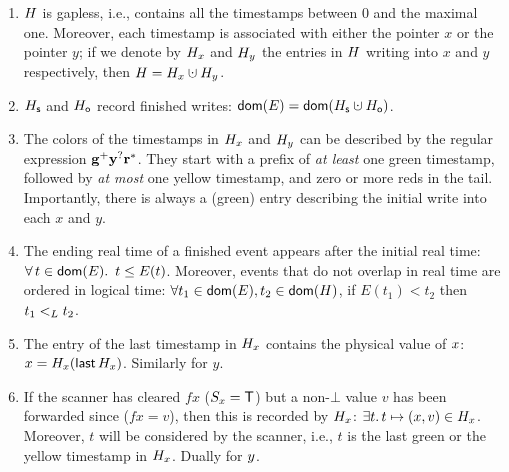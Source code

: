 \begin{enumerate}

\item\label{inv:gapless} $H$ is gapless, i.e., contains all the timestamps between
  $0$ and the maximal one. Moreover, each timestamp is associated with
  either the pointer $x$ or the pointer $y$; if we denote by $H_x$
  and $H_y$ the entries in $H$ writing into $x$ and $y$
  respectively, then $\hist = \histx \hunion \histy$. 

\item\label{inv:finished} $H_{\mathsf{s}}$ and $H_{\mathsf{o}}$ record finished writes: $\dom{E} =
  \dom{\histS \hunion \histO}$. 

\item\label{inv:color} The colors of the timestamps in $H_x$ and
  $H_y$ can be described by the regular expression ${\mathbf{{g^{+}}{y^{?}}{r^{*}}}}$. They
  start with a prefix of \emph{at least} one green timestamp, followed
  by \emph{at most} one yellow timestamp, and zero or more reds in the
  tail. Importantly, there is always a (green) entry describing the
  initial write into each $x$ and $y$.
%

\item\label{inv:overlap} The ending real time of a finished event
  appears after the initial real time: $\forall\, t \in
  \mathsf{dom}(E)\mathord{.}\,\ t \leq E(t)$.   Moreover, events that
  do not overlap in real time are ordered in logical time: $\forall
  t_1 \in \mathsf{dom}(E), t_2 \in \mathsf{dom}(H)$, if $E(t_1) < t_2$ then $t_1
  \mathrel{<_L} t_2$.

\item\label{inv:lastkey} The entry of the last timestamp in $H_x$
  contains the physical value of $x$: $x = H_x (\mathsf{last}\,
  H_x)$. Similarly for $y$. 

\item\label{inv:forward} If the scanner has cleared $\mathit{fx}$
  ($S_x = \mathsf{T}$) but a non-$\bot$ value $v$ has been forwarded since
  ($\mathit{fx} = v$), then this is recorded by $H_x$:
  $\exists t\mathord{.}\, t \mapsto (x, v) \in H_x$. Moreover, $t$ will be
  considered by the scanner, i.e., $t$ is the last green or the yellow
  timestamp in $H_x$. Dually for $y$.


\end{enumerate}
